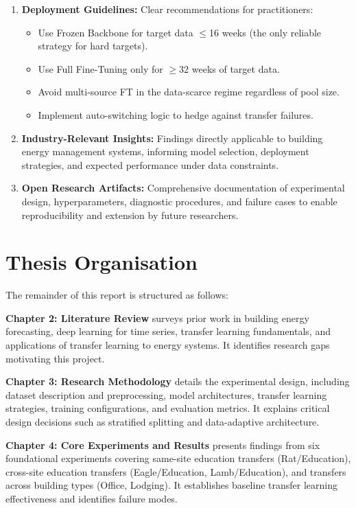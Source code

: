 \documentclass[12pt,a4paper]{report}
\begin{document}
\begin{enumerate}
    \item \textbf{Deployment Guidelines:} Clear recommendations for practitioners:
    \begin{itemize}
        \item Use Frozen Backbone for target data $\leq$16 weeks (the only reliable strategy for hard targets).
        \item Use Full Fine-Tuning only for $\geq$32 weeks of target data.
        \item Avoid multi-source FT in the data-scarce regime regardless of pool size.
        \item Implement auto-switching logic to hedge against transfer failures.
    \end{itemize}
    
    \item \textbf{Industry-Relevant Insights:} Findings directly applicable to building energy management systems, informing model selection, deployment strategies, and expected performance under data constraints.
    
    \item \textbf{Open Research Artifacts:} Comprehensive documentation of experimental design, hyperparameters, diagnostic procedures, and failure cases to enable reproducibility and extension by future researchers.
\end{enumerate}

\section{Thesis Organisation}

The remainder of this report is structured as follows:

\textbf{Chapter 2: Literature Review} surveys prior work in building energy forecasting, deep learning for time series, transfer learning fundamentals, and applications of transfer learning to energy systems. It identifies research gaps motivating this project.

\textbf{Chapter 3: Research Methodology} details the experimental design, including dataset description and preprocessing, model architectures, transfer learning strategies, training configurations, and evaluation metrics. It explains critical design decisions such as stratified splitting and data-adaptive architecture.

\textbf{Chapter 4: Core Experiments and Results} presents findings from six foundational experiments covering same-site education transfers (Rat/Education), cross-site education transfers (Eagle/Education, Lamb/Education), and transfers across building types (Office, Lodging). It establishes baseline transfer learning effectiveness and identifies failure modes.
\end{document}
